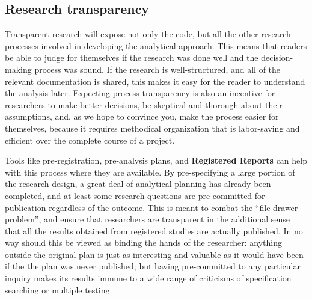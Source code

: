 \subsection{Research transparency}

Transparent research will expose not only the code,
but all the other research processes involved in developing the analytical approach.
This means that readers be able to judge for themselves if the research was done well
and the decision-making process was sound.
If the research is well-structured, and all of the relevant documentation
is shared, this makes it easy for the reader to understand the analysis later.
Expecting process transparency is also an incentive for researchers to make better decisions,
be skeptical and thorough about their assumptions,
and, as we hope to convince you, make the process easier for themselves,
because it requires methodical organization that is labor-saving and efficient over the complete course of a project.

Tools like pre-registration, pre-analysis plans, and
\textbf{Registered Reports}
can help with this process where they are available.
By pre-specifying a large portion of the research design,
a great deal of analytical planning has already been completed,
and at least some research questions are pre-committed for publication regardless of the outcome.
This is meant to combat the ``file-drawer problem'',\cite{simonsohn2014p}
and ensure that researchers are transparent in the additional sense that
all the results obtained from registered studies are actually published.
In no way should this be viewed as binding the hands of the researcher:
anything outside the original plan is just as interesting and valuable
as it would have been if the the plan was never published;
but having pre-committed to any particular inquiry makes its results
immune to a wide range of criticisms of specification searching or multiple testing.

